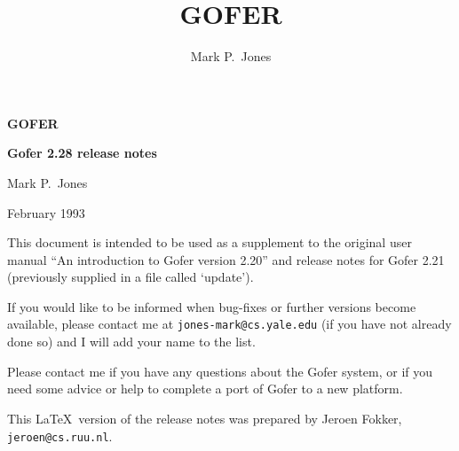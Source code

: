 \setcounter{tocdepth}{3}
\setcounter{secnumdepth}{3}
\makeatletter
\def\@dottedtocline#1#2#3#4#5{\ifnum #1>\c@tocdepth \else
  \vskip \z@ plus .2pt
  {\leftskip #2\relax \rightskip \@tocrmarg \parfillskip -\rightskip
    \parindent #2\relax\@afterindenttrue
   \interlinepenalty\@M
   \leavevmode 
   \@tempdima #3\relax \advance\leftskip \@tempdima \hbox{}\hskip -\leftskip
    \mbox{#4}\nobreak%
    \mbox{{\sl ~~~#5}}
    \hfill{ }
   \par
}\fi}

  \def\l@section#1#2{\pagebreak[3]
   \vskip 1.0em plus 1pt \@tempdima 1.5em \begingroup
   \parindent \z@ \leftskip\@tempdima \rightskip \@pnumwidth
   \hspace{6mm}
   \bf \leavevmode \hbox{}\hskip-\@tempdima\relax #1 %
   {\sl ~~~#2}\hfil
   \endgroup}
\makeatother


\title{{\Huge\bf GOFER}}
\author{{\Large Mark P.\ Jones}}

\thispagestyle{empty}
\vspace*{15mm}
\begin{center}
{\Huge\bf GOFER}
\vspace{5mm}

{\Large\bf Gofer 2.28 release notes}
\vspace{5cm}

{\Large Mark P.~Jones}
\vspace{10mm}

{\Large February 1993}
\vspace{3cm}

\end{center}
\setcounter{page}{0}
\newpage
\tableofcontents

\setlength{\parindent}{0pt}
\setlength{\parskip}{3pt}
\newpage

This document is intended to be used as a supplement to the original
user manual ``An introduction to Gofer version 2.20'' and release
notes for Gofer 2.21 (previously supplied in a file called `update').

If you would like to be informed when bug-fixes or further versions
become available, please contact me at \verb"jones-mark@cs.yale.edu" (if you
have not already done so) and I will add your name to the list.

Please contact me if you have any questions about the Gofer system, or
if you need some advice or help to complete a port of Gofer to a new
platform.

This \LaTeX\ version of the release notes was prepared
by Jeroen Fokker, \verb"jeroen@cs.ruu.nl".

